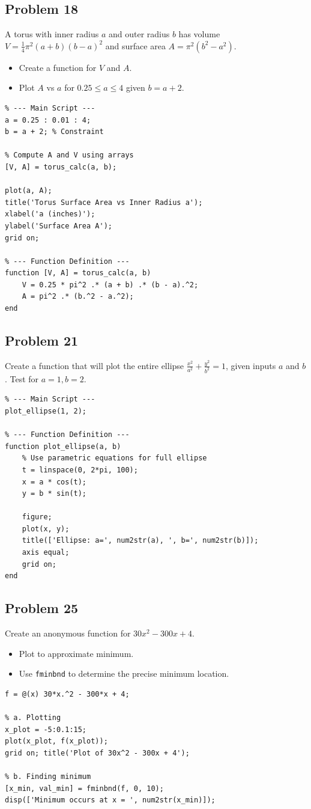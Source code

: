 \documentclass[DIN, pagenumber=false, fontsize=11pt, parskip=half]{scrartcl}
\newcommand{\myproblem}[1]{\subsection*{#1}}
\begin{document}
\myproblem{Problem 18}
A torus with inner radius $a$ and outer radius $b$ has volume $V=\frac{1}{4}\pi^{2}(a+b)(b-a)^{2}$ and surface area $A=\pi^{2}(b^{2}-a^{2})$.
\begin{itemize}
    \item[a.] Create a function for $V$ and $A$.
    \item[b.] Plot $A$ vs $a$ for $0.25 \le a \le 4$ given $b = a + 2$.
\end{itemize}

\begin{lstlisting}
% --- Main Script ---
a = 0.25 : 0.01 : 4;
b = a + 2; % Constraint

% Compute A and V using arrays
[V, A] = torus_calc(a, b);

plot(a, A);
title('Torus Surface Area vs Inner Radius a');
xlabel('a (inches)');
ylabel('Surface Area A');
grid on;

% --- Function Definition ---
function [V, A] = torus_calc(a, b)
    V = 0.25 * pi^2 .* (a + b) .* (b - a).^2;
    A = pi^2 .* (b.^2 - a.^2);
end
\end{lstlisting}

\myproblem{Problem 21}
Create a function that will plot the entire ellipse $\frac{x^{2}}{a^{2}}+\frac{y^{2}}{b^{2}}=1$, given inputs $a$ and $b$. Test for $a=1, b=2$.

\begin{lstlisting}
% --- Main Script ---
plot_ellipse(1, 2);

% --- Function Definition ---
function plot_ellipse(a, b)
    % Use parametric equations for full ellipse
    t = linspace(0, 2*pi, 100);
    x = a * cos(t);
    y = b * sin(t);
    
    figure;
    plot(x, y);
    title(['Ellipse: a=', num2str(a), ', b=', num2str(b)]);
    axis equal;
    grid on;
end
\end{lstlisting}

\myproblem{Problem 25}
Create an anonymous function for $30x^{2}-300x+4$.
\begin{itemize}
    \item[a.] Plot to approximate minimum.
    \item[b.] Use \texttt{fminbnd} to determine the precise minimum location.
\end{itemize}

\begin{lstlisting}
f = @(x) 30*x.^2 - 300*x + 4;

% a. Plotting
x_plot = -5:0.1:15;
plot(x_plot, f(x_plot));
grid on; title('Plot of 30x^2 - 300x + 4');

% b. Finding minimum
[x_min, val_min] = fminbnd(f, 0, 10);
disp(['Minimum occurs at x = ', num2str(x_min)]);
\end{lstlisting}
\end{document}
